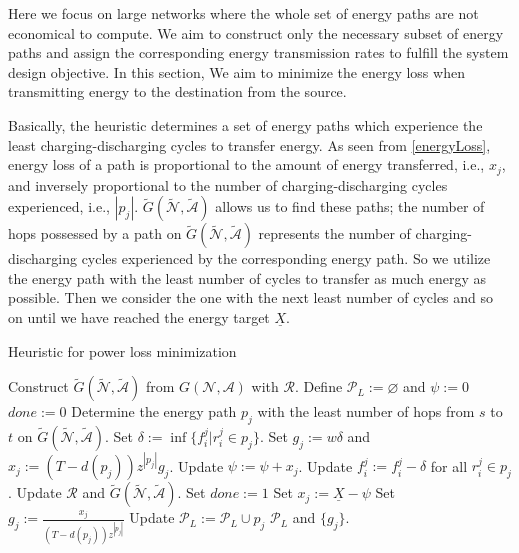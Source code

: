 \documentclass[journal]{IEEEtran}
\begin{document}
Here we focus on large networks where the whole set of energy paths are not economical to compute. We aim to construct only the necessary subset of energy paths and assign the corresponding energy transmission rates to fulfill the system design objective. 
In this section, We aim to minimize the energy loss when transmitting energy to the destination from the source. 


Basically, the heuristic determines a set of energy paths which experience the least charging-discharging cycles to transfer energy. As seen from \eqref{energyLoss}, energy loss of a path is proportional to the amount of energy transferred, i.e., $x_j$, and inversely proportional to the number of  charging-discharging cycles experienced, i.e., $|p_j|$. $\tilde{G}(\tilde{\mathcal{N}},\tilde{\mathcal{A}})$ allows us to find these paths; the number of hops possessed by a path on $\tilde{G}(\tilde{\mathcal{N}},\tilde{\mathcal{A}})$  represents the number of charging-discharging cycles experienced by the corresponding energy path. So we utilize the energy path with the least number of cycles to transfer as much energy as possible. Then we consider  the one with the next least number of cycles and so on until we have reached the energy target $\underline{X}$.

\begin{algorithm}
\caption{Heuristic for power loss minimization} \label{ratealgo}
\begin{algorithmic}[1]
\STATE Construct $\tilde{G}(\tilde{\mathcal{N}},\tilde{\mathcal{A}})$ from $G(\mathcal{N},\mathcal{A})$ with $\mathcal{R}$.
\STATE Define $\mathcal{P}_{L}:=\varnothing$ and $\psi:=0$
\STATE $done :=0$
\REPEAT
	\STATE Determine the energy path $p_j$ with the least number of hops from $s$ to $t$ on $\tilde{G}(\tilde{\mathcal{N}},\tilde{\mathcal{A}})$.
	\STATE Set $\delta := \inf\{f_i^j|r_i^j\in p_j\}$.
	\STATE Set $g_j :=w\delta$ and $x_j:=(T-d(p_j))z^{|p_j|}g_j$.
		\STATE Update $\psi:=\psi + x_j$.
		\STATE Update $f_i^j:=f_i^j-\delta$ for all $r_i^j\in p_j$.
		\STATE Update $\mathcal{R}$ and $\tilde{G}(\tilde{\mathcal{N}},\tilde{\mathcal{A}})$.
	\ELSE
		\STATE Set $done:=1$
		\STATE Set $x_j:=\underline{X}-\psi$
		\STATE Set $g_j:=\frac{x_j}{(T-d(p_j))z^{|p_j|}}$
	\ENDIF
	\STATE Update $\mathcal{P}_{L}:=\mathcal{P}_{L}\cup p_j$
\RETURN $\mathcal{P}_{L}$ and $\{g_j\}$.
\end{algorithmic}
\end{algorithm}
\end{document}
